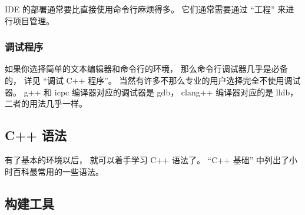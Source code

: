 IDE 的部署通常要比直接使用命令行麻烦得多。 它们通常需要通过 “工程” 来进行项目管理。

\subsubsection{调试程序}
如果你选择简单的文本编辑器和命令行的环境， 那么命令行调试器几乎是必备的， 详见 “调试 C++ 程序”。 当然有许多不那么专业的用户选择完全不使用调试器。 g++ 和 icpc 编译器对应的调试器是 gdb， clang++ 编译器对应的是 lldb， 二者的用法几乎一样。

\subsection{C++ 语法}
有了基本的环境以后， 就可以着手学习 C++ 语法了。 “C++ 基础” 中列出了小时百科最常用的一些语法。

\subsection{构建工具}
